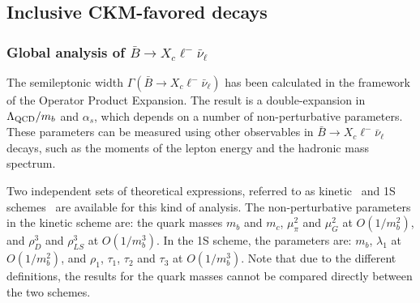 \subsection{Inclusive CKM-favored decays}
\label{slbdecays_b2cincl}

\subsubsection{Global analysis of $\bar B\to X_c\ell^-\bar\nu_\ell$}

The semileptonic width $\Gamma(\bar B\to X_c\ell^-\bar\nu_\ell)$ has
been calculated in the framework of the Operator Product
Expansion. The result is a double-expansion in $\Lambda_{\rm QCD}/m_b$
and $\alpha_s$, which depends on a number of non-perturbative
parameters. These parameters can be measured using other observables
in $\bar B\to X_c\ell^-\bar\nu_\ell$ decays, such as the moments of
the lepton energy and the hadronic mass spectrum.

Two independent sets of theoretical expressions, referred to as
kinetic~\cite{Benson:2003kp,Gambino:2004qm,Gambino:2011cq} and 1S
schemes~\cite{Bauer:2004ve} are available for this kind of
analysis. The non-perturbative parameters in the kinetic scheme
are: the quark masses $m_b$ and $m_c$, $\mu^2_\pi$ and
$\mu^2_G$ at $O(1/m^2_b)$, and $\rho^3_D$ and $\rho^3_{LS}$ at
$O(1/m^3_b)$. In the 1S scheme, the parameters are: $m_b$, $\lambda_1$
at $O(1/m^2_b)$, and $\rho_1$, $\tau_1$, $\tau_2$ and $\tau_3$ at
$O(1/m^3_b)$. Note that due to the different definitions, the results
for the quark masses cannot be compared directly between the two
schemes.

